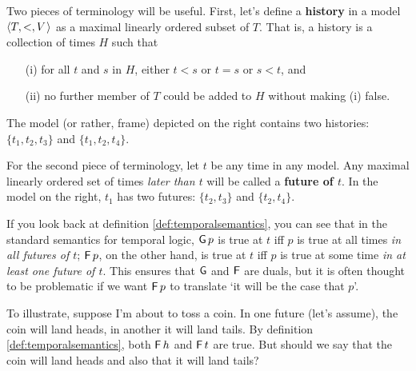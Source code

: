 Two pieces of terminology will be useful. First, let's define a \textbf{history}
in a model $\t{T,<,V}$ as a maximal linearly ordered subset of $T$. That is, a
history is a collection of times $H$ such that
\begin{itemize}[leftmargin=10mm]
  \itemsep0mm
\item[(i)] for all $t$ and $s$ in $H$, either $t<s$ or $t=s$ or $s<t$, and
\item[(ii)] no further member of $T$ could be added to $H$ without
  making (i) false.
\end{itemize}
%
\noindent
\begin{wrapfigure}{r}{4cm}
  \vspace{-8mm}
  \quad
  \vspace{-10mm}
\end{wrapfigure}

\noindent
The model (or rather, frame) depicted on the right contains two
histories: $\{ t_1, t_2, t_3 \}$ and $\{ t_1, t_2, t_4 \}$.

For the second piece of terminology, let $t$ be any time in any model. Any
maximal linearly ordered set of times \emph{later than $t$} will be called a
\textbf{future of $t$}. In the model on the right, $t_1$ has two futures:
$\{ t_2, t_3 \}$ and $\{ t_2, t_4 \}$.

If you look back at definition \ref{def:temporalsemantics}, you can see that in
the standard semantics for temporal logic, $\operatorname{\mathsf{G}} p$ is true at $t$ iff $p$ is
true at all times \emph{in all futures of $t$}; $\operatorname{\mathsf{F}} p$, on the other hand, is
true at $t$ iff $p$ is true at some time \emph{in at least one future of $t$}.
This ensures that $\operatorname{\mathsf{G}}$ and $\operatorname{\mathsf{F}}$ are duals, but it is often thought to be
problematic if we want $\operatorname{\mathsf{F}} p$ to translate `it will be the case that $p$'.

To illustrate, suppose I'm about to toss a coin. In one future (let's assume),
the coin will land heads, in another it will land tails. By definition
\ref{def:temporalsemantics}, both $\operatorname{\mathsf{F}} h$ and $\operatorname{\mathsf{F}} t$ are true. But should we
say that the coin will land heads and also that it will land tails?

